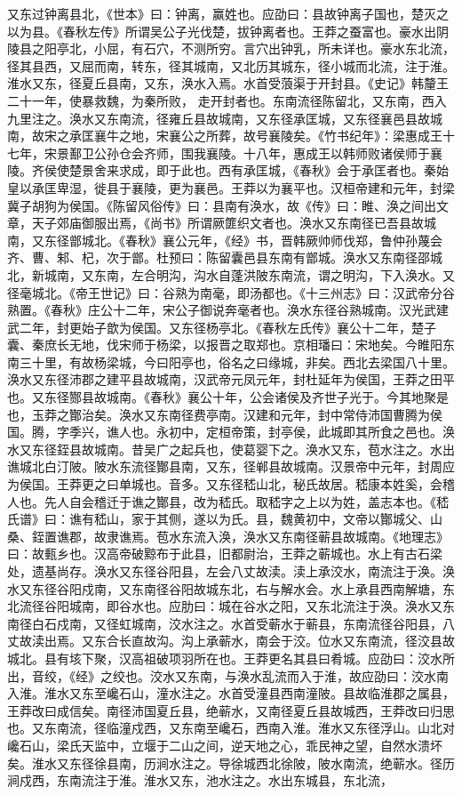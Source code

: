 \documentclass[12pt,UTF8]{ctexbook}
\begin{document}
又东过钟离县北，《世本》曰：钟离，赢姓也。应劭曰：县故钟离子国也，楚灭之以为县。《春秋左传》所谓吴公子光伐楚，拔钟离者也。王莽之蚕富也。豪水出阴陵县之阳亭北，小屈，有石穴，不测所穷。言穴出钟乳，所未详也。豪水东北流，径其县西，又屈而南，转东，径其城南，又北历其城东，径小城而北流，注于淮。淮水又东，径夏丘县南，又东，涣水入焉。水首受蒗渠于开封县。《史记》韩釐王二十一年，使暴救魏，为秦所败， 走开封者也。东南流径陈留北，又东南，西入九里注之。涣水又东南流，径雍丘县故城南，又东径承匡城，又东径襄邑县故城南，故宋之承匡襄牛之地，宋襄公之所葬，故号襄陵矣。《竹书纪年》：梁惠成王十七年，宋景鄯卫公孙仓会齐师，围我襄陵。十八年，惠成王以韩师败诸侯师于襄陵。齐侯使楚景舍来求成，即于此也。西有承匡城，《春秋》会于承匡者也。秦始皇以承匡卑湿，徙县于襄陵，更为襄邑。王莽以为襄平也。汉桓帝建和元年，封梁冀子胡狗为侯国。《陈留风俗传》曰：县南有涣水，故《传》曰：睢、涣之间出文章，天子郊庙御服出焉，《尚书》所谓厥篚织文者也。涣水又东南径已吾县故城南，又东径鄫城北。《春秋》襄公元年，《经》书，晋韩厥帅师伐郑，鲁仲孙蔑会齐、曹、邾、杞，次于鄫。杜预曰：陈留囊邑县东南有鄫城。涣水又东南径邵城北，新城南，又东南，左合明沟，沟水自蓬洪陂东南流，谓之明沟，下入涣水。又径毫城北。《帝王世记》曰：谷熟为南毫，即汤都也。《十三州志》曰：汉武帝分谷熟置。《春秋》庄公十二年，宋公子御说奔毫者也。涣水东径谷熟城南。汉光武建武二年，封更始子歆为侯国。又东径杨亭北。《春秋左氏传》襄公十二年，楚子囊、秦庶长无地，伐宋师于杨梁，以报晋之取郑也。京相璠曰：宋地矣。今睢阳东南三十里，有故杨梁城，今曰阳亭也，俗名之曰缘城，非矣。西北去梁国八十里。涣水又东径沛郡之建平县故城南，汉武帝元凤元年，封杜延年为侯国，王莽之田平也。又东径酂县故城南。《春秋》襄公十年，公会诸侯及齐世子光于。今其地聚是也，玉莽之酇治矣。涣水又东南径费亭南。汉建和元年，封中常侍沛国曹腾为侯国。腾，字季兴，谯人也。永初中，定桓帝策，封亭侯，此城即其所食之邑也。涣水又东径銍县故城南。昔吴广之起兵也，使葛婴下之。涣水又东，苞水注之。水出谯城北白汀陂。陂水东流径酇县南，又东，径郸县故城南。汉景帝中元年，封周应为侯国。王莽更之曰单城也。音多。又东径嵇山北，秘氏故居。嵇康本姓奚，会稽人也。先人自会稽迁于谯之酇县，改为嵇氏。取嵇字之上以为姓，盖志本也。《嵇氏谱》曰：谯有嵇山，家于其侧，遂以为氏。县，魏黄初中，文帝以酇城父、山桑、銍置谯郡，故隶谯焉。苞水东流入涣，涣水又东南径蕲县故城南。《地理志》曰：故甀乡也。汉高帝破黥布于此县，旧都尉治，王莽之蕲城也。水上有古石梁处，遗基尚存。涣水又东径谷阳县，左会八丈故渎。渎上承洨水，南流注于涣。涣水又东径谷阳戍南，又东南径谷阳故城东北，右与解水会。水上承县西南解塘，东北流径谷阳城南，即谷水也。应肋曰：城在谷水之阳，又东北流注于涣。涣水又东南径白石戍南，又径虹城南，洨水注之。水首受蕲水于蕲县，东南流径谷阳县，八丈故渎出焉。又东合长直故沟。沟上承蕲水，南会于洨。位水又东南流，径洨县故城北。县有垓下聚，汉高祖破项羽所在也。王莽更名其县曰肴城。应劭曰：洨水所出，音绞，《经》之绞也。洨水又东南，与涣水乱流而入于淮，故应劭曰：洨水南入淮。淮水又东至巉石山，潼水注之。水首受潼县西南潼陂。县故临淮郡之属县，王莽改曰成信矣。南径沛国夏丘县，绝蕲水，又南径夏丘县故城西，王莽改曰归思也。又东南流，径临潼戍西，又东南至巉石，西南入淮。淮水又东径浮山。山北对巉石山，梁氏天监中，立堰于二山之间，逆天地之心，乖民神之望，自然水溃坏矣。淮水又东径徐县南，历涧水注之。导徐城西北徐陂，陂水南流，绝蕲水。径历涧戍西，东南流注于淮。淮水又东，池水注之。水出东城县，东北流，
\end{document}
